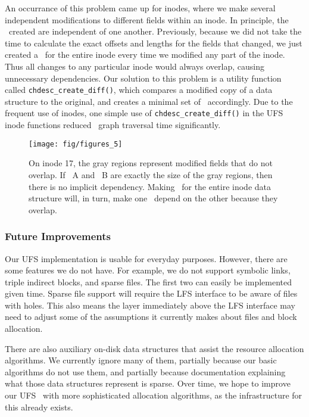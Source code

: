 An occurrance of this problem came up for inodes, where we make several
independent modifications to different fields within an inode. In principle,
the \chdescs\ created are independent of one another. Previously, because we
did not take the time to calculate the exact offsets and lengths for the fields
that changed, we just created a \chdesc\ for the entire inode every time we
modified any part of the inode. Thus all changes to any particular inode would
always overlap, causing unnecessary dependencies. Our solution to this problem
is a utility function called \texttt{chdesc\_create\_diff()}, which compares a
modified copy of a data structure to the original, and creates a minimal set of
\chdescs\ accordingly. Due to the frequent use of inodes, one simple use of
\texttt{chdesc\_create\_diff()} in the UFS inode functions reduced \chdesc\
graph traversal time significantly.

\begin{figure}[htb]
  \centering
  \texttt{[image: fig/figures\_5]}
  \caption{\label{fig:overlap} On inode 17, the gray regions represent
  modified fields that do not overlap. If \chdesc\ A and \chdesc\ B are
  exactly the size of the gray regions, then there is no implicit dependency.
  Making \chdescs\ for the entire inode data structure will, in turn, make
  one \chdesc\ depend on the other because they overlap.}
\end{figure}

\subsubsection {Future Improvements}
Our UFS implementation is usable for everyday purposes. However, there are
some features we do not have. For example, we do not support symbolic links,
triple indirect blocks, and sparse files. The first two can easily be
implemented given time. Sparse file support will require the LFS interface to
be aware of files with holes. This also means the layer immediately above the
LFS interface may need to adjust some of the assumptions it currently makes
about files and block allocation.

There are also auxiliary on-disk data structures that assist the resource
allocation algorithms. We currently ignore many of them, partially because
our basic algorithms do not use them, and partially because documentation
explaining what those data structures represent is sparse. Over time, we
hope to improve our UFS \module\ with more sophisticated allocation
algorithms, as the infrastructure for this already exists.

